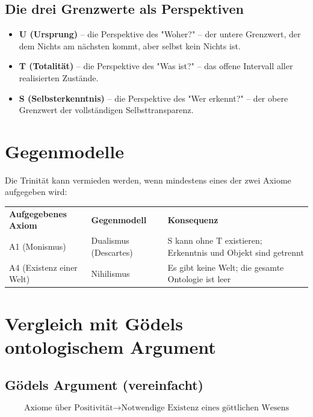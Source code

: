 \documentclass[
]{article}
\begin{document}
\subsection{Die drei Grenzwerte als Perspektiven}\label{die-drei-grenzwerte-als-perspektiven}

\begin{itemize}
\item \textbf{U (Ursprung)} – die Perspektive des "Woher?" – der untere Grenzwert, der dem Nichts am nächsten kommt, aber selbst kein Nichts ist.
\item \textbf{T (Totalität)} – die Perspektive des "Was ist?" – das offene Intervall aller realisierten Zustände.
\item \textbf{S (Selbsterkenntnis)} – die Perspektive des "Wer erkennt?" – der obere Grenzwert der vollständigen Selbsttransparenz.
\end{itemize}

\section{Gegenmodelle}\label{gegenmodelle}

Die Trinität kann vermieden werden, wenn mindestens eines der zwei Axiome aufgegeben wird:

\begin{tabular}{lll}
\textbf{Aufgegebenes Axiom} & \textbf{Gegenmodell} & \textbf{Konsequenz} \\
A1 (Monismus) & Dualismus (Descartes) & S kann ohne T existieren; Erkenntnis und Objekt sind getrennt \\
A4 (Existenz einer Welt) & Nihilismus & Es gibt keine Welt; die gesamte Ontologie ist leer \\
\end{tabular}

\section{Vergleich mit Gödels ontologischem Argument}\label{vergleich-mit-goumldels-ontologischem-argument}

\subsection{Gödels Argument (vereinfacht)}\label{goumldels-argument-vereinfacht}

\[
\text{Axiome über Positivität} \rightarrow \text{Notwendige Existenz eines göttlichen Wesens}
\]
\end{document}
